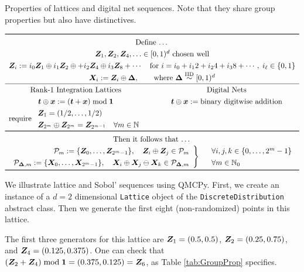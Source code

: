 \documentclass[graybox,footinfo]{svmult}
\newcommand{\IID}{\textup{IID}}
\newcommand{\IIDsim}{\overset{\IID}{\sim}}
\begin{document}
\begin{table}
	\centering
	\caption{Properties of lattices and digital net sequences.  Note that they share group properties but also have distinctives.} \label{tab:GroupProp}
\[
	\renewcommand{\arraystretch}{1.3}
\begin{array}{c@{\qquad}c}
	\toprule
	\multicolumn{2}{c}{\text{Define \ldots}} \\
	\multicolumn{2}{c}{\bsZ_1, \bsZ_2, \bsZ_4, \ldots \in [0,1)^d \text{ chosen well} } \\
	\multicolumn{2}{c}{
	\bsZ_{i} := i_0  \bsZ_1 \oplus i_1 \bsZ_{2} \oplus + i_2  \bsZ_{4} \oplus  i_3  \bsZ_{8} + \cdots 
	\quad
	\text{for }i = i_0 +i_1 2 + i_2 4 + i_3 8 + \cdots, \; i_\ell \in \{0,1\}} \\
    \multicolumn{2}{c}{\bsX_i := \bsZ_i \oplus \bsDelta, \qquad \text{where }\bsDelta \IIDsim [0,1)^d} \\  \hline
	\text{Rank-1 Integration Lattices} & \text{Digital Nets} \\
		\bst \oplus \bsx : = (\bst + \bsx) \bmod \bsone & \bst \oplus \bsx := \text{binary digitwise addition} \\ 
		 \text{require } \begin{array}{l} \bsZ_1 = (1/2, \ldots, 1/2) \\
		 	\bsZ_{2^{m}} \oplus \bsZ_{2^{m}} = \bsZ_{2^{m-1}} \quad \forall m \in \bbN \end{array}
		\\
\toprule
\multicolumn{2}{c}{\text{Then it follows that \ldots}} \\
	\multicolumn{2}{c}{\left . \begin{array}{r}
			\calP_m := \{\bsZ_0, \ldots, \bsZ_{2^m-1}\}, \quad
			\bsZ_i \oplus \bsZ_j \in \calP_m \\
			\calP_{\bsDelta,m} := \{\bsX_0, \ldots, \bsX_{2^m-1}\}, \quad
			\bsX_i \oplus \bsX_j \ominus \bsX_k \in \calP_{\bsDelta,m}
	\end{array} \right \}\quad \begin{array}{l}\forall  i,j,k \in \{0, \ldots, 2^{m} -1\} \\ \forall m \in \bbN_0\end{array}} \\
\bottomrule
\end{array}
\]
\end{table}

We illustrate lattice and Sobol' sequences using QMCPy. First, we create an instance of a $d=2$ dimensional \texttt{Lattice} object of the  \texttt{DiscreteDistribution} abstract class. Then we generate the first eight (non-randomized) points in this lattice. 

The first three generators for this lattice are ${\boldsymbol{Z}}_1 = (0.5, 0.5)$, ${\boldsymbol{Z}}_2 = (0.25, 0.75)$, and ${\boldsymbol{Z}}_4 = (0.125, 0.375)$.  One can check that $({\boldsymbol{Z}}_2 + {\boldsymbol{Z}}_4) \bmod {\boldsymbol{1}} = (0.375, 0.125) = {\boldsymbol{Z}}_6$, as Table \ref{tab:GroupProp} specifies.
\end{document}
